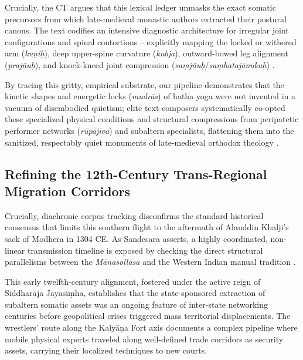 \documentclass[11pt,twoside,letterpaper]{article}
\begin{document}
Crucially, the CT argues that this lexical ledger unmasks the exact somatic precursors from which late-medieval monastic authors extracted their postural canons. The text codifies an intensive diagnostic architecture for irregular joint configurations and spinal contortions -- explicitly mapping the locked or withered arm (\textit{kuṇiḥ}), deep upper-spine curvature (\textit{kubja}), outward-bowed leg alignment (\textit{prajñuḥ}), and knock-kneed joint compression (\textit{saṃjñuḥ}/\textit{saṃhatajānukaḥ}) \citep{Berger2023}. 

By tracing this gritty, empirical substrate, our pipeline demonstrates that the kinetic shapes and energetic locks (\textit{mudrās}) of hatha yoga were not invented in a vacuum of disembodied quietism; elite text-composers systematically co-opted these specialized physical conditions and structural compressions from peripatetic performer networks (\textit{rūpājīvā}) and subaltern specialists, flattening them into the sanitized, respectably quiet monuments of late-medieval orthodox theology \citep{Berger2023, Birch2024, Wujastyk2025}.

\subsection{Refining the 12th-Century Trans-Regional Migration Corridors}
Crucially, diachronic corpus tracking disconfirms the standard historical consensus that limits this southern flight to the aftermath of Alauddin Khalji's sack of Modhera in 1304 CE. As Sandesara asserts, a highly coordinated, non-linear transmission timeline is exposed by checking the direct structural parallelisms between the \textit{Mānasollāsa} and the Western Indian manual tradition \citep{Sandesara1948}. 

This early twelfth-century alignment, fostered under the active reign of Siddharāja Jayasiṃha, establishes that the state-sponsored extraction of subaltern somatic assets was an ongoing feature of inter-state networking centuries before geopolitical crises triggered mass territorial displacements. The wrestlers' route along the Kalyāṇa Fort axis documents a complex pipeline where mobile physical experts traveled along well-defined trade corridors as security assets, carrying their localized techniques to new courts.

\end{document}
